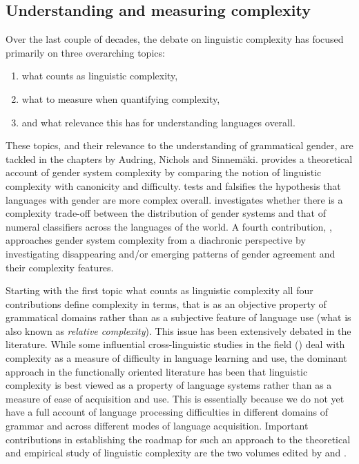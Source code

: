 \documentclass[output=collectionpaper]{langsci/langscibook}
\begin{document}
  \subsection{Understanding and measuring complexity}
\label{sec:WDG:2.1}
Over the last couple of decades, the debate on linguistic complexity has focused primarily on three overarching topics:

\begin{enumerate}[label=(\roman*)]
\item what counts as linguistic complexity,
\item what to measure when quantifying complexity,
\item and what relevance this has for understanding languages overall.
\end{enumerate}

\noindent These topics, and their relevance to the understanding of grammatical gender, are tackled in the chapters by Audring, Nichols and Sinnemäki.  provides a theoretical account of gender system complexity by comparing the notion of linguistic complexity with canonicity and difficulty.  tests and falsifies the hypothesis that languages with gender are more complex overall.  investigates whether there is a complexity trade-off between the distribution of gender systems and that of numeral classifiers across the languages of the world. A fourth contribution, , approaches gender system complexity from a diachronic perspective by investigating disappearing and/or emerging patterns of gender agreement and their complexity features.

Starting with the first topic \textendash{} what counts as linguistic complexity \textendash{} all four contributions define complexity in  terms, that is as an objective property of grammatical domains rather than as a subjective feature of language use (what is also known as \emph{relative complexity}). This issue has been extensively debated in the literature. While some influential cross-linguistic studies in the field (\citealt{Kusters2003,Kusters2008}) deal with complexity as a measure of difficulty in language learning and use, the dominant approach in the functionally oriented literature has been that linguistic complexity is best viewed as a property of language systems rather than as a measure of ease of acquisition and use. This is essentially because we do not yet have a full account of language processing difficulties in different domains of grammar and across different modes of language acquisition. Important contributions in establishing the roadmap for such an approach to the theoretical and empirical study of linguistic complexity are the two volumes edited by \citet{Miestamo2008b} and \citet{Sampson2009}.
\end{document}
